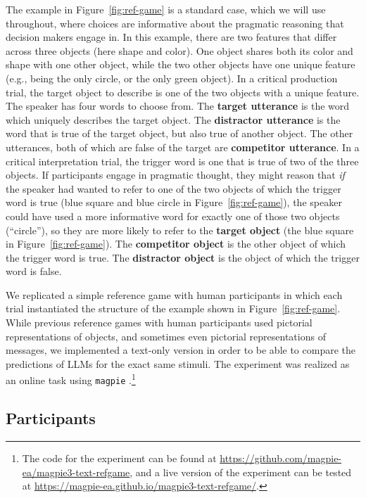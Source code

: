\documentclass[fleqn]{article}
\begin{document}
The example in Figure~\ref{fig:ref-game} is a standard case, which we will use throughout, where choices are informative about the pragmatic reasoning that decision makers engage in.
In this example, there are two features that differ across three objects (here shape and color).
One object shares both its color and shape with one other object, while the two other objects have one unique feature (e.g., being the only circle, or the only green object).
%
In a critical production trial, the target object to describe is one of the two objects with a unique feature.
The speaker has four words to choose from.
The \textbf{target utterance} is the word which uniquely describes the target object.
The \textbf{distractor utterance} is the word that is true of the target object, but also true of another object.
The other utterances, both of which are false of the target are \textbf{competitor utterance}.
%
In a critical interpretation trial, the trigger word is one that is true of two of the three objects.
If participants engage in pragmatic thought, they might reason that \emph{if} the speaker had wanted to refer to one of the two objects of which the trigger word is true (blue square and blue circle in Figure~\ref{fig:ref-game}), the speaker could have used a more informative word for exactly one of those two objects (``circle''), so they are more likely to refer to the \textbf{target object} (the blue square in Figure~\ref{fig:ref-game}).
The \textbf{competitor object} is the other object of which the trigger word is true.
The \textbf{distractor object} is the object of which the trigger word is false.

We replicated a simple reference game with human participants in which each trial instantiated the structure of the example shown in Figure~\ref{fig:ref-game}.
While previous reference games with human participants used pictorial representations of objects, and sometimes even pictorial representations of messages, we implemented a text-only version in order to be able to compare the predictions of LLMs for the exact same stimuli.
The experiment was realized as an online task using \texttt{magpie} \citep{FrankeJi:magpie:-Minimal}.\footnote{
  The code for the experiment can be found at \href{https://github.com/magpie-ea/magpie3-text-refgame}{https://github.com/magpie-ea/magpie3-text-refgame}, and a live version of the experiment can be tested at \href{https://magpie-ea.github.io/magpie3-text-refgame/}{https://magpie-ea.github.io/magpie3-text-refgame/}.
}


\subsection{Participants}
\label{participants}
\end{document}
